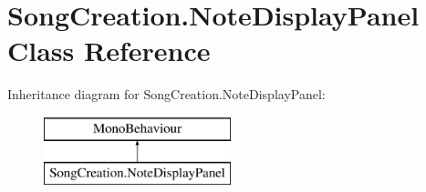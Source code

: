 \hypertarget{class_song_creation_1_1_note_display_panel}{}\section{Song\+Creation.\+Note\+Display\+Panel Class Reference}
\label{class_song_creation_1_1_note_display_panel}
Inheritance diagram for Song\+Creation.\+Note\+Display\+Panel\+:\begin{figure}[H]
\begin{center}
\leavevmode
\includegraphics[height=2.000000cm]{class_song_creation_1_1_note_display_panel}
\end{center}
\end{figure}
